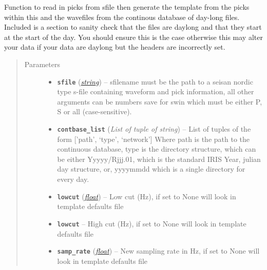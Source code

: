 \documentclass[a4paper,10pt,english]{sphinxmanual}
\begin{document}

\begin{fulllineitems}
\label{core:template_gen.from_contbase}
Function to read in picks from sfile then generate the template from the
picks within this and the wavefiles from the continous database of day-long
files.  Included is a section to sanity check that the files are daylong and
that they start at the start of the day.  You should ensure this is the case
otherwise this may alter your data if your data are daylong but the headers
are incorrectly set.
\begin{quote}\begin{description}
\item[{Parameters}] \leavevmode\begin{itemize}
\item {} 
\textbf{\texttt{sfile}} (\href{https://docs.python.org/library/string.html\#module-string}{\emph{string}}) -- sfilename must be the path to a seisan nordic type s-file             containing waveform and pick information, all other arguments can             be numbers save for swin which must be either P, S or all             (case-sensitive).

\item {} 
\textbf{\texttt{contbase\_list}} (\emph{List of tuple of string}) -- List of tuples of the form {[}'path', `type', `network'{]}                    Where path is the path to the continuous database, type is                    the directory structure, which can be either Yyyyy/Rjjj.01,                    which is the standard IRIS Year, julian day structure, or,                    yyyymmdd which is a single directory for every day.

\item {} 
\textbf{\texttt{lowcut}} (\href{https://docs.python.org/library/functions.html\#float}{\emph{float}}) -- Low cut (Hz), if set to None will look in template            defaults file

\item {} 
\textbf{\texttt{lowcut}} -- High cut (Hz), if set to None will look in template            defaults file

\item {} 
\textbf{\texttt{samp\_rate}} (\href{https://docs.python.org/library/functions.html\#float}{\emph{float}}) -- New sampling rate in Hz, if set to None will look in            template defaults file


\end{itemize}
\end{description}
\end{quote}
\end{fulllineitems}
\end{document}
